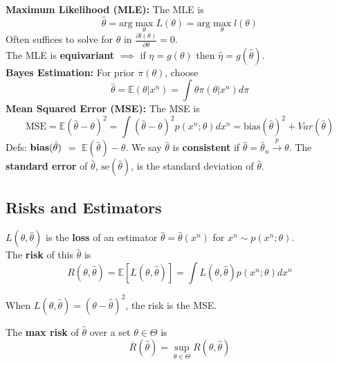 \documentclass[10pt,twocolumn]{article}
\begin{document}
\textbf{Maximum Likelihood (MLE):} The MLE is
\begin{equation}
\hat{\theta} = \text{arg}\max_{\theta} L(\theta) = \text{arg}\max_{\theta} l(\theta)
\end{equation}
Often suffices to solve for $\theta$ in $\frac{\partial l(\theta)}{\partial \theta} = 0$.\\
The MLE is \textbf{equivariant} $\implies$ if $\eta = g(\theta)$ then $\hat{\eta} = g(\hat{\theta})$. \\
\textbf{Bayes Estimation:} For prior $\pi(\theta)$, choose 
\begin{equation}
    \hat{\theta} = \mathbb{E}(\theta|x^{n}) = \int \theta \pi(\theta|x^{n}) d\pi
\end{equation}
\textbf{Mean Squared Error (MSE):} The MSE is
\begin{equation}
    \text{MSE} = \mathbb{E}(\hat{\theta} - \theta)^{2} = \int (\hat{\theta}-\theta)^{2} p(x^{n};\theta)dx^{n} = \text{bias}({\hat{\theta}})^{2} + Var(\hat{\theta})
\end{equation}
Defs: $\text{\textbf{bias}}(\hat{\theta})$ $=$ $\mathbb{E}(\hat{\theta}) - \theta$. We say $\hat{\theta}$ is \textbf{consistent} if $\hat{\theta} = \hat{\theta}_{n} \xrightarrow{p} \theta$. The \textbf{standard error} of $\hat{\theta}$, $\text{se}(\hat{\theta})$, is the standard deviation of $\hat{\theta}$.\\

\subsection*{Risks and Estimators}
$L(\theta,\hat{\theta})$ is the \textbf{loss} of an estimator $\hat{\theta} = \hat{\theta}(x^{n})$ for $x^{n} \sim p(x^{n};\theta)$.\\
The \textbf{risk} of this $\hat{\theta}$ is
\begin{equation}
    R(\theta,\hat{\theta}) = \mathbb{E}[L(\theta,\hat{\theta})] = \int L(\theta,\hat{\theta}) p(x^{n};\theta) dx^{n}
\end{equation}

When $L(\theta,\hat{\theta}) = (\theta-\hat{\theta})^{2}$, the risk is the MSE.

The \textbf{max risk} of $\hat{\theta}$ over a set $\theta \in \Theta$ is
\begin{equation}
    \overline{R}(\hat{\theta}) = \sup_{\theta \in \Theta} R(\theta,\hat{\theta})
\end{equation}
\end{document}
